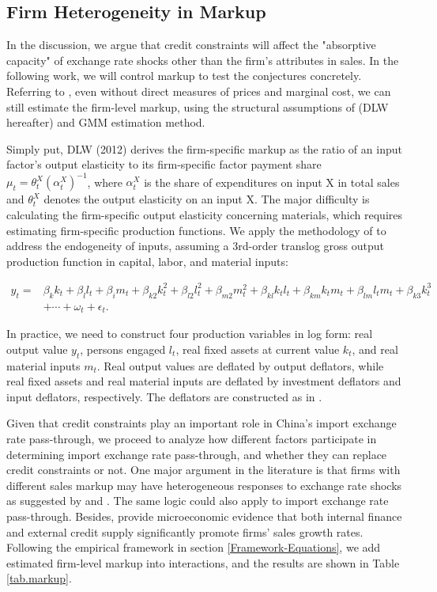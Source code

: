 \documentclass[12pt]{article}
\begin{document}
\subsection{Firm Heterogeneity in Markup}
In the discussion, we argue that credit constraints will affect the "absorptive capacity" of exchange rate shocks other than the firm's attributes in sales. In the following work, we will control markup to test the conjectures concretely. Referring to \cite{bkl2021}, even without direct measures of prices and marginal cost, we can still estimate the firm-level markup, using the structural assumptions of \cite{dlw2012} (DLW hereafter) and GMM estimation method.

Simply put, DLW (2012)\cite{dlw2012} derives the firm-specific markup as the ratio of an input factor's output elasticity to its firm-specific factor payment share $\mu_{t}=\theta_{t}^{X}\left(\alpha_{t}^{X}\right)^{-1}$, where $\alpha_{t}^{X}$ is the share of expenditures on input X in total sales and $\theta^X_t$ denotes the output elasticity on an input X. The major difficulty is calculating the firm-specific output elasticity concerning materials, which requires estimating firm-specific production functions. We apply the methodology of \cite{acf2015} to address the endogeneity of inputs, assuming a 3rd-order translog gross output production function in capital, labor, and material inputs:

$$
\begin{aligned}
	y_{t}= &\beta_{k} k_{t}+\beta_{l} l_{t}+\beta_{i} m_{t}+\beta_{k 2} k_{t}^{2}+\beta_{l 2} l_{t}^{2}+\beta_{m 2} m_{t}^{2}+\beta_{k l} k_{ t} l_{t}+\beta_{k m} k_{t} m_{t}+\beta_{l m} l_{t} m_{t}+\beta_{k 3} k_{t}^{3}\\
	&+\cdots+\omega_{t}+\epsilon_{t}.
\end{aligned}
$$

In practice, we need to construct four production variables in log form: real output value $y_t$, persons engaged $l_t$, real fixed assets at current value $k_t$, and real material inputs $m_t$. Real output values are deflated by output deflators, while real fixed assets and real material inputs are deflated by investment deflators and input deflators, respectively. The deflators are constructed as in \cite{brandt2012}.

Given that credit constraints play an important role in China's import exchange rate pass-through, we proceed to analyze how different factors participate in determining import exchange rate pass-through, and whether they can replace credit constraints or not. One major argument in the literature is that firms with different sales markup may have heterogeneous responses to exchange rate shocks as suggested by \cite{bmm2012} and \cite{lmx2015}. The same logic could also apply to import exchange rate pass-through. Besides, \cite{llz2018} provide microeconomic evidence that both internal finance and external credit supply significantly promote firms' sales growth rates. Following the empirical framework in section \ref{Framework-Equations}, we add estimated firm-level markup into interactions, and the results are shown in Table \ref{tab.markup}.
\end{document}
